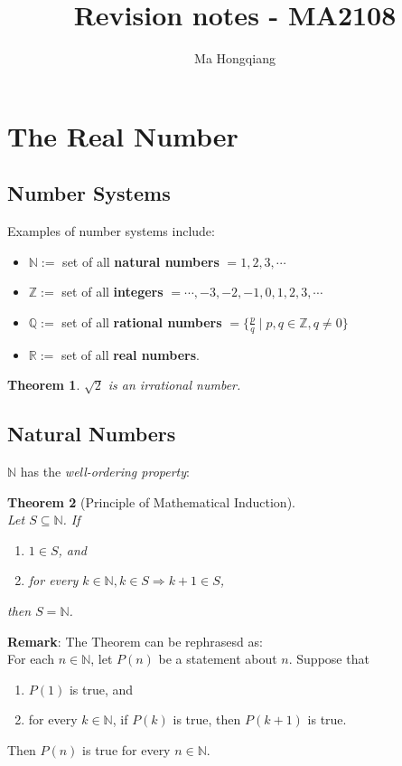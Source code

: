 \documentclass[12pt]{article}
\newtheorem{theorem}{Theorem}[section]
\theoremstyle{definition}
\begin{document}
\title{Revision notes - MA2108}
\author{Ma Hongqiang}
\maketitle
\tableofcontents

\clearpage

\section{The Real Number}
\subsection{Number Systems}
Examples of number systems include:
\begin{itemize}
\item $\mathbb{N}:=$ set of all \textbf{natural numbers} $={1,2,3,\cdots}$
\item $\mathbb{Z}:=$ set of all \textbf{integers} $= {\cdots,-3,-2,-1,0,1,2,3,\cdots}$
\item $\mathbb{Q}:=$ set of all \textbf{rational numbers} $= \{\frac{p}{q}\mid p,q\in\mathbb{Z},q\neq 0\}$
\item $\mathbb{R}:=$ set of all \textbf{real numbers}.
\end{itemize}
\begin{theorem}
\normalfont $\sqrt{2}$ is an irrational number.
\end{theorem}
\subsection{Natural Numbers}
$\mathbb{N}$ has the \textit{well-ordering property}:
\begin{center}
\end{center}
\begin{theorem}[Principle of Mathematical Induction]
\hfill\\\normalfont Let $S\subseteq\mathbb{N}$. If
\begin{enumerate}[label=(\roman*)]
\item $1\in S$, and
\item for every $k\in\mathbb{N}, k\in S\Rightarrow k+1\in S$,
\end{enumerate}
then $S=\mathbb{N}$.
\end{theorem}
\textbf{Remark}: The Theorem can be rephrasesd as:\\
For each $n\in\mathbb{N}$, let $P(n)$ be a statement about $n$. Suppose that
\begin{enumerate}[label=(\roman*)]
\item $P(1)$ is true, and 
\item for every $k\in\mathbb{N}$, if $P(k)$ is true, then $P(k+1)$ is true.
\end{enumerate}
Then $P(n)$ is true for every $n\in\mathbb{N}$.
\end{document}

